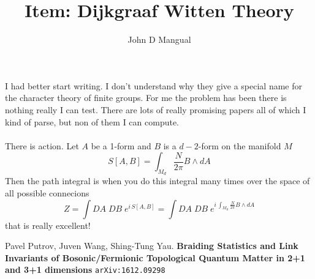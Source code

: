 \documentclass[12pt]{article}
\title{\textbf{Item: Dijkgraaf Witten Theory}}
\author{John D Mangual}
\date{}
\begin{document}
\selectfont \fontsize{12.5}{15}\selectfont

\maketitle

\noindent I had better start writing.  I don't understand why they give a special name for the character theory of finite groups.  For me the problem has been there is nothing really I can test.  There are lots of really promising papers all of which I kind of parse, but non of them I can compute. \\ \\
There is action.  Let $A$ be a 1-form and $B$ is a $d-2$-form on the manifold $M$
$$  S[A,B] = \int_{M_d}  \frac{N}{2\pi} B \wedge dA $$
Then the path integral is when you do this integral many times over the space of all possible connecions
$$ Z = \int DA \; DB \; e^{i \, S[A,B]} = \int DA \; DB \; e^{i \, \int_{M_d}  \frac{N}{2\pi} B \wedge dA} $$
that is really excellent!

\vfill

\selectfont \fontsize{12}{10}\selectfont

\begin{thebibliography}{}



\item Pavel Putrov, Juven Wang, Shing-Tung Yau.  \textbf{Braiding Statistics and Link Invariants of Bosonic/Fermionic Topological Quantum Matter in 2+1 and 3+1 dimensions}
\texttt{arXiv:1612.09298}

\end{thebibliography}
\end{document}
